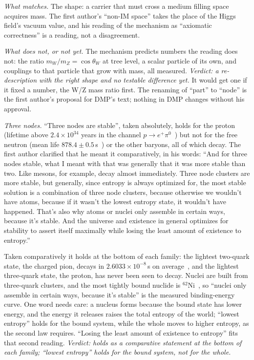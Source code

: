 \documentclass[11pt,a4paper]{article}
\theoremstyle{definition}
\theoremstyle{remark}
\begin{document}
\noindent\emph{What matches.} The shape: a carrier that must cross a medium filling space acquires mass. The first author's ``non-IM
space'' takes the place of the Higgs field's vacuum value, and his reading of the mechanism as ``axiomatic correctness'' is a reading, not
a disagreement.

\noindent\emph{What does not, or not yet.} The mechanism predicts numbers the reading does not: the ratio $m_W/m_Z=\cos\theta_W$ at tree
level, a scalar particle of its own, and couplings to that particle that grow with mass, all measured. \emph{Verdict: a re-description
with the right shape and no testable difference yet.} It would get one if it fixed a number, the W/Z mass ratio first. The renaming of
``part'' to ``node'' is the first author's proposal for DMP's text; nothing in DMP changes without his approval.

\noindent\emph{Three nodes.} ``Three nodes are stable'', taken absolutely, holds for
the proton (lifetime above $2.4\times10^{34}$ years in the channel $p\to e^+\pi^0$~\cite{superk}) but not for the free neutron (mean life
$878.4\pm0.5$\,s~\cite{pdgn}) or the other baryons, all of which decay. The first author clarified that he meant it comparatively, in his
words: ``And for three nodes stable, what I meant with that was generally that it was more
stable than two. Like mesons, for example, decay almost immediately. Three node clusters are more stable, but generally, since entropy is
always optimized for, the most stable solution is a combination of three node clusters, because otherwise we wouldn't have atoms,
because if it wasn't the lowest entropy state, it wouldn't have happened. That's also why atoms or nuclei only assemble in certain ways,
because it's stable. And the universe and existence in general optimizes for stability to assert itself maximally while losing the least
amount of existence to entropy.''

\noindent Taken comparatively it holds at the bottom of each family: the lightest two-quark state, the charged pion, decays in
$2.6033\times10^{-8}$\,s on average~\cite{pdgpi}, and the lightest three-quark state, the proton, has never been seen to decay. Nuclei
are built from three-quark clusters, and the most tightly bound nuclide is ${}^{62}$Ni~\cite{fewell}, so ``nuclei only assemble in
certain ways, because it's stable'' is the measured binding-energy curve. One word needs care: a nucleus forms because the bound state has
lower energy, and the energy it releases raises the total entropy of the world; ``lowest entropy'' holds for the bound system, while the
whole moves to higher entropy, as the second law requires. ``Losing the least amount of existence to entropy'' fits that second reading.
\emph{Verdict: holds as a comparative statement at the bottom of each family; ``lowest entropy'' holds for the bound system, not for the
whole.}
\end{document}
